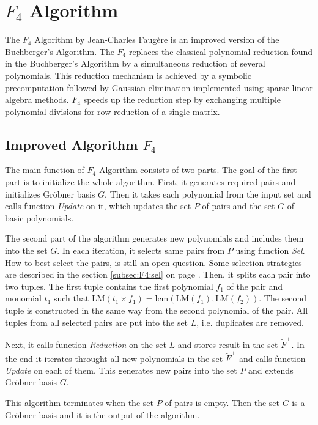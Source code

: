 \section{$F_4$ Algorithm}
The $F_4$ Algorithm \cite{F4} by Jean-Charles Faug\`ere is an improved version of the Buchberger's Algorithm. The $F_4$ replaces the classical polynomial reduction found in the Buchberger's Algorithm by a simultaneous reduction of several polynomials. This reduction mechanism is achieved by a symbolic precomputation followed by Gaussian elimination implemented using sparse linear algebra methods. $F_4$ speeds up the reduction step by exchanging multiple polynomial divisions for row-reduction of a single matrix.

\subsection{Improved Algorithm $F_4$}
The main function of $F_4$ Algorithm consists of two parts. The goal of the first part is to initialize the whole algorithm. First, it generates required pairs and initializes Gr\"obner basis $G$. Then it takes each polynomial from the input set and calls function \textit{Update} on it, which updates the set $P$ of pairs and the set $G$ of basic polynomials.

The second part of the algorithm generates new polynomials and includes them into the set $G$. In each iteration, it selects same pairs from $P$ using function \textit{Sel}. How to best select the pairs, is still an open question. Some selection strategies are described in the section \ref{subsec:F4:sel} on page \pageref{subsec:F4:sel}. Then, it splits each pair into two tuples. The first tuple contains the first polynomial $f_1$ of the pair and monomial $t_1$ such that $\textrm{LM}(t_1 \times f_1) = \textrm{lcm}(\textrm{LM}(f_1),\textrm{LM}(f_2))$. The second tuple is constructed in the same way from the second polynomial of the pair. All tuples from all selected pairs are put into the set $L$, i.e. duplicates are removed.

Next, it calls function \textit{Reduction} on the set $L$ and stores result in the set $\tilde{F}^+$. In the end it iterates throught all new polynomials in the set $\tilde{F}^+$ and calls function \textit{Update} on each of them. This generates new pairs into the set $P$ and extends Gr\"obner basis $G$.

This algorithm terminates when the set $P$ of pairs is empty. Then the set $G$ is a Gr\"obner basis and it is the output of the algorithm.

